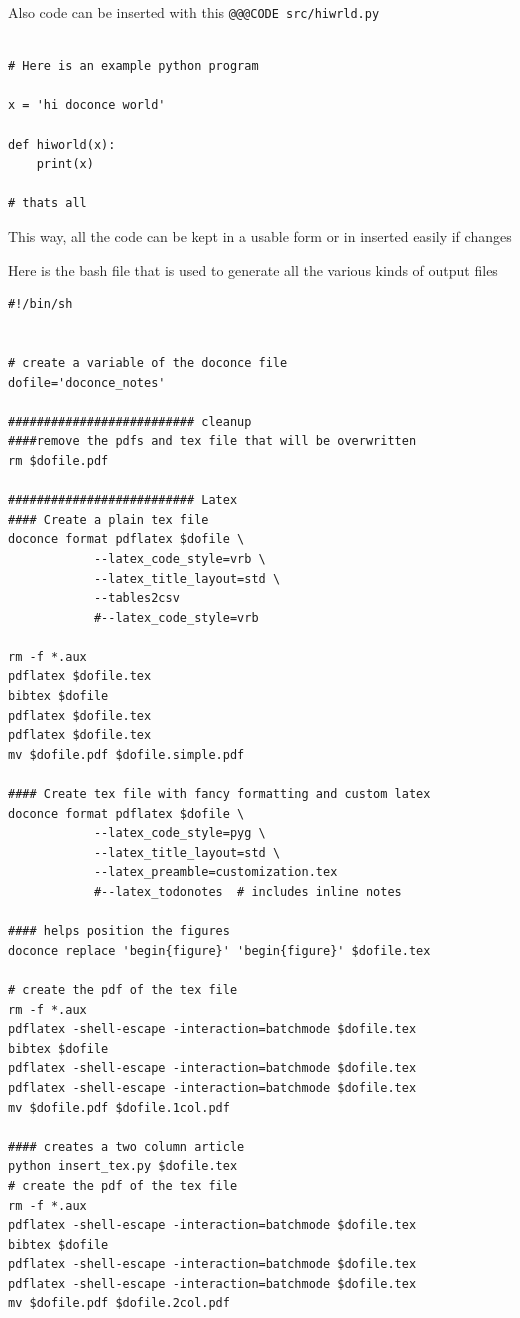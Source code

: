 \documentclass[%
twocolumn,
twoside,                 %
final,                   %
10pt]{article}
\begin{document}
Also code can be inserted with this \Verb!@@@CODE src/hiwrld.py!

\begin{verbatim}

# Here is an example python program

x = 'hi doconce world'

def hiworld(x):
    print(x)

# thats all
\end{verbatim}

This way, all the code can be kept in a usable form or in inserted easily if changes

Here is the bash file that is used to generate all the various kinds of output files
\begin{verbatim}
#!/bin/sh


# create a variable of the doconce file
dofile='doconce_notes'

########################## cleanup 
####remove the pdfs and tex file that will be overwritten
rm $dofile.pdf

########################## Latex 
#### Create a plain tex file
doconce format pdflatex $dofile \
			--latex_code_style=vrb \
			--latex_title_layout=std \
			--tables2csv  
			#--latex_code_style=vrb

rm -f *.aux
pdflatex $dofile.tex
bibtex $dofile
pdflatex $dofile.tex
pdflatex $dofile.tex
mv $dofile.pdf $dofile.simple.pdf

#### Create tex file with fancy formatting and custom latex
doconce format pdflatex $dofile \
			--latex_code_style=pyg \
			--latex_title_layout=std \
			--latex_preamble=customization.tex
			#--latex_todonotes  # includes inline notes

#### helps position the figures
doconce replace 'begin{figure}' 'begin{figure}' $dofile.tex

# create the pdf of the tex file	
rm -f *.aux				
pdflatex -shell-escape -interaction=batchmode $dofile.tex
bibtex $dofile
pdflatex -shell-escape -interaction=batchmode $dofile.tex
pdflatex -shell-escape -interaction=batchmode $dofile.tex
mv $dofile.pdf $dofile.1col.pdf

#### creates a two column article
python insert_tex.py $dofile.tex
# create the pdf of the tex file	
rm -f *.aux				
pdflatex -shell-escape -interaction=batchmode $dofile.tex
bibtex $dofile
pdflatex -shell-escape -interaction=batchmode $dofile.tex
pdflatex -shell-escape -interaction=batchmode $dofile.tex
mv $dofile.pdf $dofile.2col.pdf


\end{verbatim}
\end{document}
